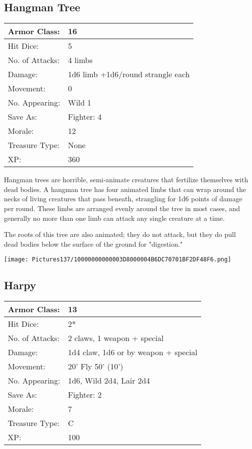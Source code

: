 \documentclass[a4paper,twoside,openany,10pt]{book}
\begin{document}
\begin{multicols}{2}
\subsection*{Hangman Tree}\label{hangman-tree}

\begin{tabularx}{0.48\textwidth}{@{}lX@{}}
Armor Class: & 16 \\\hline
Hit Dice: & 5 \\\hline
No. of Attacks: & 4 limbs \\\hline
Damage: & 1d6 limb +1d6/round strangle each \\\hline
Movement: & 0 \\\hline
No. Appearing: & Wild 1 \\\hline
Save As: & Fighter: 4 \\\hline
Morale: & 12 \\\hline
Treasure Type: & None \\\hline
XP: & 360 \\\hline
\end{tabularx}\medskip

Hangman trees are horrible, semi-animate creatures that fertilize themselves with dead bodies. A hangman tree has four animated limbs that can wrap around the necks of living creatures that pass beneath, strangling for 1d6 points of damage per round. These limbs are arranged evenly around the tree in most cases, and generally no more than one limb can attack any single creature at a time.

The roots of this tree are also animated; they do not attack, but they do pull dead bodies below the surface of the ground for "digestion."

\begin{center}
	\texttt{[image: Pictures137/10000000000003D8000004B6DC70701BF2DF48F6.png]}
\end{center}

\subsection*{Harpy}\label{harpy}

\begin{tabularx}{0.48\textwidth}{@{}lX@{}}
Armor Class: & 13 \\\hline
Hit Dice: & 2* \\\hline
No. of Attacks: & 2 claws, 1 weapon + special \\\hline
Damage: & 1d4 claw, 1d6 or by weapon + special \\\hline
Movement: & 20' Fly 50'
(10') \\\hline
No. Appearing: & 1d6, Wild 2d4, Lair 2d4 \\\hline
Save As: & Fighter: 2 \\\hline
Morale: & 7 \\\hline
Treasure Type: & C \\\hline
XP: & 100 \\\hline
\end{tabularx}\medskip


\end{multicols}
\end{document}
